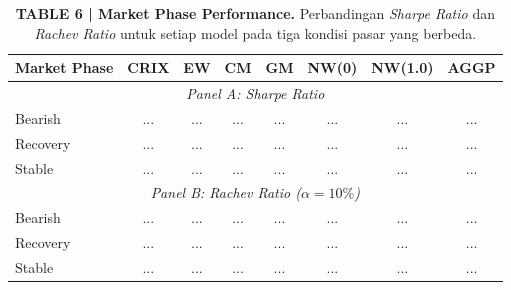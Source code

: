 \documentclass[12pt,a4paper]{article}
\begin{document}
\begin{table}[h]
    \centering
    \footnotesize
    \caption{\textbf{TABLE 6 | Market Phase Performance.} Perbandingan \textit{Sharpe Ratio} dan \textit{Rachev Ratio} untuk setiap model pada tiga kondisi pasar yang berbeda.}
    \begin{tabular}{lccccccc}
        \toprule
        Market Phase & CRIX & EW & CM & GM & NW(0) & NW(1.0) & AGGP \\
        \midrule
        \multicolumn{8}{c}{\textit{Panel A: Sharpe Ratio}} \\
        Bearish  & ... & ... & ... & ... & ... & ... & ... \\
        Recovery & ... & ... & ... & ... & ... & ... & ... \\
        Stable   & ... & ... & ... & ... & ... & ... & ... \\
        \midrule
        \multicolumn{8}{c}{\textit{Panel B: Rachev Ratio ($\alpha=10\%$)}} \\
        Bearish  & ... & ... & ... & ... & ... & ... & ... \\
        Recovery & ... & ... & ... & ... & ... & ... & ... \\
        Stable   & ... & ... & ... & ... & ... & ... & ... \\
        \bottomrule
    \end{tabular}
\end{table}
\end{document}
